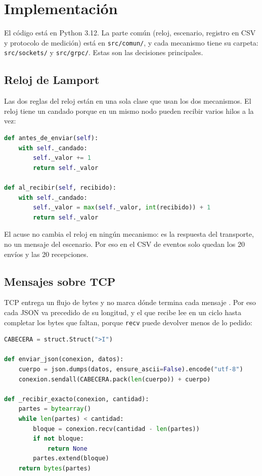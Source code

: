 \documentclass[11pt,a4paper]{article}
\begin{document}
\section{Implementación}

El código está en Python 3.12. La parte común (reloj, escenario, registro en CSV y protocolo de medición) está en \texttt{src/comun/}, y cada mecanismo tiene su carpeta: \texttt{src/sockets/} y \texttt{src/grpc/}. Estas son las decisiones principales.

\subsection{Reloj de Lamport}

Las dos reglas del reloj \cite{lamport1978} están en una sola clase que usan los dos mecanismos. El reloj tiene un candado porque en un mismo nodo pueden recibir varios hilos a la vez:

\begin{lstlisting}[language=Python]
def antes_de_enviar(self):
    with self._candado:
        self._valor += 1
        return self._valor

def al_recibir(self, recibido):
    with self._candado:
        self._valor = max(self._valor, int(recibido)) + 1
        return self._valor
\end{lstlisting}

El acuse no cambia el reloj en ningún mecanismo: es la respuesta del transporte, no un mensaje del escenario. Por eso en el CSV de eventos solo quedan los 20 envíos y las 20 recepciones.

\subsection{Mensajes sobre TCP}

TCP entrega un flujo de bytes y no marca dónde termina cada mensaje \cite{rfc9293}. Por eso cada JSON va precedido de su longitud, y el que recibe lee en un ciclo hasta completar los bytes que faltan, porque \texttt{recv} puede devolver menos de lo pedido:

\begin{lstlisting}[language=Python]
CABECERA = struct.Struct(">I")

def enviar_json(conexion, datos):
    cuerpo = json.dumps(datos, ensure_ascii=False).encode("utf-8")
    conexion.sendall(CABECERA.pack(len(cuerpo)) + cuerpo)

def _recibir_exacto(conexion, cantidad):
    partes = bytearray()
    while len(partes) < cantidad:
        bloque = conexion.recv(cantidad - len(partes))
        if not bloque:
            return None
        partes.extend(bloque)
    return bytes(partes)
\end{lstlisting}
\end{document}
